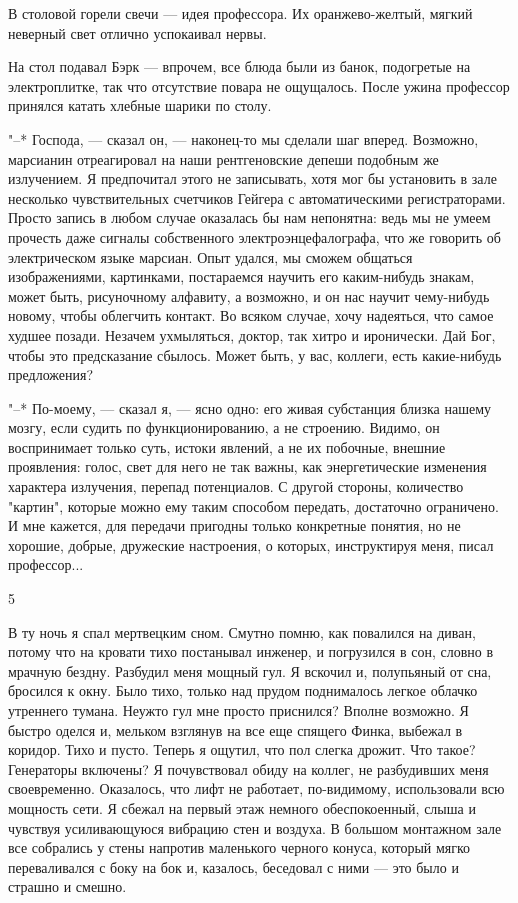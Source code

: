 В столовой горели свечи --- идея профессора. Их  оранжево-желтый,  мягкий
неверный свет отлично успокаивал нервы.

На стол подавал Бэрк --- впрочем, все блюда были из банок, подогретые  на
электроплитке,  так  что  отсутствие  повара  не  ощущалось.  После  ужина
профессор принялся катать хлебные шарики по столу.

"--* Господа, --- сказал он, --- наконец-то мы сделали шаг  вперед.  Возможно,
марсианин  отреагировал  на  наши   рентгеновские   депеши   подобным   же
излучением. Я предпочитал этого не записывать, хотя мог  бы  установить  в
зале  несколько  чувствительных  счетчиков   Гейгера   с   автоматическими
регистраторами. Просто запись в любом случае оказалась бы  нам  непонятна:
ведь мы не умеем прочесть даже сигналы собственного  электроэнцефалографа,
что же говорить об электрическом языке марсиан.  Опыт  удался,  мы  сможем
общаться изображениями, картинками, постараемся научить  его  каким-нибудь
знакам, может быть, рисуночному алфавиту, а  возможно,  и  он  нас  научит
чему-нибудь новому,  чтобы  облегчить  контакт.  Во  всяком  случае,  хочу
надеяться, что самое худшее позади. Незачем ухмыляться, доктор, так  хитро
и иронически. Дай Бог, чтобы это предсказание сбылось. Может быть, у  вас,
коллеги, есть какие-нибудь предложения?

"--* По-моему, --- сказал я, --- ясно одно: его живая субстанция близка нашему
мозгу,  если  судить  по  функционированию,  а  не  строению.  Видимо,  он
воспринимает только суть,  истоки  явлений,  а  не  их  побочные,  внешние
проявления:  голос,  свет  для  него  не  так  важны,  как  энергетические
изменения характера излучения,  перепад  потенциалов.  С  другой  стороны,
количество "картин", которые можно ему таким способом передать, достаточно
ограничено.  И  мне  кажется,  для  передачи  пригодны  только  конкретные
понятия,  но  не  хорошие,  добрые,  дружеские  настроения,   о   которых,
инструктируя меня, писал профессор...

\bigskip{}



\bigskip{}

5

\bigskip{}


В ту ночь я спал мертвецким сном. Смутно помню, как повалился на диван,
потому что на кровати тихо постанывал инженер, и погрузился в сон,  словно
в мрачную бездну. Разбудил меня мощный гул. Я  вскочил  и,  полупьяный  от
сна, бросился к окну. Было тихо,  только  над  прудом  поднималось  легкое
облачко  утреннего  тумана.  Неужто  гул  мне  просто  приснился?   Вполне
возможно. Я быстро оделся и, мельком взглянув на все  еще  спящего  Финка,
выбежал в коридор. Тихо и пусто. Теперь я ощутил, что пол  слегка  дрожит.
Что такое?  Генераторы  включены?  Я  почувствовал  обиду  на  коллег,  не
разбудивших  меня  своевременно.  Оказалось,   что   лифт   не   работает,
по-видимому, использовали всю мощность  сети.  Я  сбежал  на  первый  этаж
немного обеспокоенный, слыша и  чувствуя  усиливающуюся  вибрацию  стен  и
воздуха.  В  большом  монтажном  зале  все  собрались  у  стены   напротив
маленького черного конуса, который мягко переваливался с боку  на  бок  и,
казалось, беседовал с ними --- это было и страшно и смешно.

